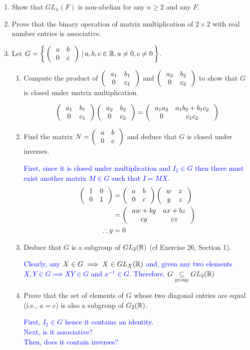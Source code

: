 \documentclass[10pt,a4paper]{report}
\newcommand{\BLUE}[1]{\textcolor{blue}{#1}}
\begin{document}
\begin{enumerate}
\item Show that $GL_n(F)$ is non-abelian for any $n \ge 2$ and any $F$.

\item Prove that the binary operation of matrix multiplication of $2\times 2$ with real number entries is associative.

\item Let $G=\left \{\, \left (\,  \begin{array}{c c} a&b \\ 0 & c \end{array}  \,\right )\,|\, a,b,c \in \mathbb{R}, a\ne 0, c\ne 0 \,\right \}$.
\begin{enumerate}
	\item Compute the product of $\left (\,  \begin{array}{c c} a_1&b_1 \\ 0 & c_1 \end{array}  \,\right )$ and $\left (\,  \begin{array}{c c} a_2&b_2 \\ 0 & c_2 \end{array}  \,\right )$ to show that $G$ is closed under matrix multiplication.
	
	\BLUE{\begin{align*}
		\left (\,  \begin{array}{c c} a_1&b_1 \\ 0 & c_1 \end{array}  \,\right )\left (\,  \begin{array}{c c} a_2&b_2 \\ 0 & c_2 \end{array}  \,\right ) = 
		\left (\,  \begin{array}{c c} a_1a_2&a_1b_2+b_1c_2 \\ 0 & c_1c_2 \end{array}  \,\right )
	\end{align*}
	}
	
	\item Find the matrix $N=\left (\,  \begin{array}{c c} a&b \\ 0 & c \end{array}  \,\right )$ and deduce that $G$ is closed under inverses.
	
	\BLUE{First, since it is closed under multiplication and $I_2 \in G$ then there must exist another matrix $M \in G$ such that $I=MX$.
	\begin{align*}
		\left (\,  \begin{array}{c c} 1&0 \\ 0 & 1 \end{array}  \,\right ) &= \left (\,  \begin{array}{c c} a&b \\ 0 & c \end{array}  \,\right )\left (\,  \begin{array}{c c} w&x \\ y & z \end{array}  \,\right )\\	
		&= \left (\,  \begin{array}{c c} aw+by&ax+bz \\ cy & cz \end{array}  \,\right ) \\
		\therefore y&=0
	\end{align*}
	}
	
	\item Deduce that $G$ is a subgroup of $GL_2(\mathbb{R})$ (cf Exercise 26, Section 1).

	\BLUE{
		Clearly, any $X\in G \implies X \in GL_X(\mathbb{R})$ and, given any two elements $X, Y \in G \implies XY \in G$ and $x^{-1} \in G$.  Therefore, $G \underset{\text{group}}\subseteq GL_2(\mathbb{R})$ 
	}
	\item Prove that the set of elements of $G$ whose two diagonal entries are equal (i.e., $a=c$) is also a subgroup of $G_2(\mathbb{R})$.
	
	\BLUE{First, $I_2 \in G$ hence it contains an identity.\\
	Next, is it associative? \\
	Then, does it contain inverses? 
	}
\end{enumerate}
	
\end{enumerate}
\end{document}
